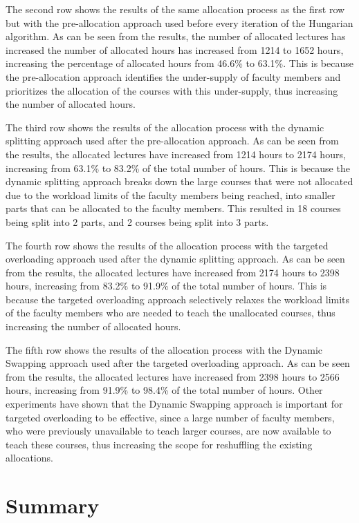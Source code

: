 The second row shows the results of the same allocation process as the first row but with the pre-allocation approach used before every iteration of the Hungarian algorithm. As can be seen from the results, the number of allocated lectures has increased the number of allocated hours has increased from 1214 to 1652 hours, increasing the percentage of allocated hours from 46.6\% to 63.1\%. This is because the pre-allocation approach identifies the under-supply of faculty members and prioritizes the allocation of the courses with this under-supply, thus increasing the number of allocated hours.

The third row shows the results of the allocation process with the dynamic splitting approach used after the pre-allocation approach. As can be seen from the results, the allocated lectures have increased from 1214 hours to 2174 hours, increasing from 63.1\% to 83.2\% of the total number of hours. This is because the dynamic splitting approach breaks down the large courses that were not allocated due to the workload limits of the faculty members being reached, into smaller parts that can be allocated to the faculty members. This resulted in 18 courses being split into 2 parts, and 2 courses being split into 3 parts.

The fourth row shows the results of the allocation process with the targeted overloading approach used after the dynamic splitting approach. As can be seen from the results, the allocated lectures have increased from 2174 hours to 2398 hours, increasing from 83.2\% to 91.9\% of the total number of hours. This is because the targeted overloading approach selectively relaxes the workload limits of the faculty members who are needed to teach the unallocated courses, thus increasing the number of allocated hours.

The fifth row shows the results of the allocation process with the Dynamic Swapping approach used after the targeted overloading approach. As can be seen from the results, the allocated lectures have increased from 2398 hours to 2566 hours, increasing from 91.9\% to 98.4\% of the total number of hours. Other experiments have shown that the Dynamic Swapping approach is important for targeted overloading to be effective, since a large number of faculty members, who were previously unavailable to teach larger courses, are now available to teach these courses, thus increasing the scope for reshuffling the existing allocations.

\section{Summary}


